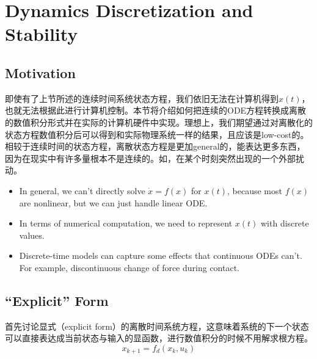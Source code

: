 \section{Dynamics Discretization and Stability}
\subsection{Motivation}
即使有了上节所述的连续时间系统状态方程，我们依旧无法在计算机得到$x(t)$，也就无法根据此进行计算机控制。本节将介绍如何把连续的ODE方程转换成离散的数值积分形式并在实际的计算机硬件中实现。理想上，我们期望通过对离散化的状态方程数值积分后可以得到和实际物理系统一样的结果，且应该是low-cost的。相较于连续时间的状态方程，离散状态方程是更加general的，能表达更多东西，因为在现实中有许多量根本不是连续的。如，在某个时刻突然出现的一个外部扰动。
\begin{itemize}
    \item In general, we can't directly solve $\dot x=f(x)$ for $x(t)$, because most $f(x)$ are nonlinear, but we can just handle linear ODE.
    \item In terms of numerical computation, we need to represent $x(t)$ with discrete values.
    \item Discrete-time models can capture some effects that continuous ODEs can't. For example, discontinuous change of force during contact.
\end{itemize}
\subsection{``Explicit'' Form}
首先讨论显式（explicit form）的离散时间系统方程，这意味着系统的下一个状态可以直接表达成当前状态与输入的显函数，进行数值积分的时候不用解求根方程。
\begin{equation}
    x_{k+1} = f_d(x_{k}, u_{k})
\end{equation}
